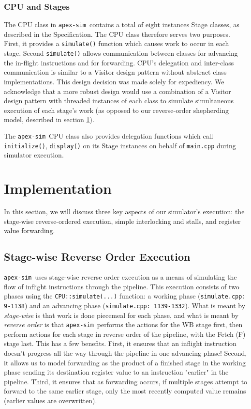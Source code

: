 \documentclass[12pt]{article}
\newcommand{\codename}[0]{\texttt{apex-sim}~}
\begin{document}
\subsubsection{CPU and Stages}
The CPU class in \codename contains a total of eight instances Stage classes, as described in the Specification. The CPU class therefore serves two purposes.
First, it provides a \texttt{simulate()} function which causes work to occur in each stage.
Second \texttt{simulate()} allows communication between classes for advancing the in-flight instructions and for forwarding.
CPU's delegation and inter-class communication is similar to a Visitor design pattern without abstract class implementations.
This design decision was made solely for expediency.
We acknowledge that a more robust design would use a combination of a Visitor design pattern with threaded instances of each class to simulate simultaneous execution of each stage's work (as opposed to our reverse-order shepherding model, described in section \ref{sec:implementation}).

The \codename CPU class also provides delegation functions which call \texttt{initialize()}, \texttt{display()} on its Stage instances on behalf of \texttt{main.cpp} during simulator execution.

\section{Implementation}
\label{sec:implementation}
In this section, we will discuss three key aspects of our simulator's execution: the stage-wise reverse-ordered execution, simple interlocking and stalls, and register value forwarding.

\subsection{Stage-wise Reverse Order Execution}
\codename uses stage-wise reverse order execution as a means of simulating the flow of inflight instructions through the pipeline.
This execution consists of two phases using the \texttt{CPU::simulate(...)} function: a working phase (\texttt{simulate.cpp: 9-1138}) and an advancing phase (\texttt{simulate.cpp: 1139-1332}).
What is meant by \textit{stage-wise} is that work is done piecemeal for each phase, and what is meant by \textit{reverse order} is that \codename performs the actions for the WB stage first, then perform actions for each stage in reverse order of the pipeline, with the Fetch (F) stage last.
This has a few benefits.
First, it ensures that an inflight instruction doesn't progress all the way through the pipeline in one advancing phase!
Second, it allows us to model forwarding as the product of a finished stage in the working phase sending its destination register value to an instruction "earlier" in the pipeline.
Third, it ensures that as forwarding occurs, if multiple stages attempt to forward to the same earlier stage, only the most recently computed value remains (earlier values are overwritten).
\end{document}
